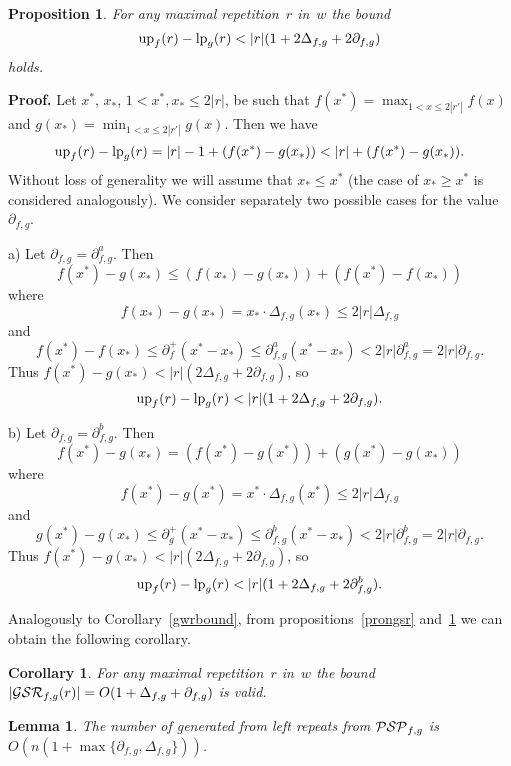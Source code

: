 \documentclass{article}
\newtheorem{proposition}{Proposition}
\newtheorem{corollary}{Corollary}
\newtheorem{lemma}{Lemma}
\begin{document}
\begin{proposition}
For any maximal repetition~$r$ in~$w$ the bound
$$
{\rm up}_f (r)-{\rm lp}_g (r)<|r|(1+2\Delta_{f, g}+2\partial_{f, g})
$$
holds.
\label{ulpound}
\end{proposition}

{\bf Proof.} Let $x^*$, $x_*$, $1<x^*,x_*\le 2|r|$, be such that  $f(x^*)=\max_{1< x\le 2|r'|}f(x)$
and $g(x_*)=\min_{1< x\le 2|r'|}g(x)$.
Then we have
$$
{\rm up}_f (r)-{\rm lp}_g (r)=|r|-1+(f(x^*)-g(x_*))<|r|+(f(x^*)-g(x_*)).
$$
Without loss of generality we will assume that $x_*\le x^*$ (the case of $x_*\ge x^*$ 
is considered analogously). We consider separately two possible cases for
the value $\partial_{f, g}$.

a) Let $\partial_{f, g}=\partial^a_{f, g}$. Then
$$
f(x^*)-g(x_*)\le (f(x_*)-g(x_*))+(f(x^*)-f(x_*))
$$
where
$$
f(x_*)-g(x_*)=x_*\cdot\Delta_{f, g}(x_*)\le 2|r|\Delta_{f, g}
$$
and
$$
f(x^*)-f(x_*)\le \partial^+_f(x^*-x_*)\le \partial^a_{f, g}(x^*-x_*)
<2|r|\partial^a_{f, g}=2|r|\partial_{f, g}.
$$
Thus $f(x^*)-g(x_*)<|r|(2\Delta_{f, g}+2\partial_{f, g})$, so
$$
{\rm up}_f (r)-{\rm lp}_g (r)<|r|(1+2\Delta_{f, g}+2\partial_{f, g}).
$$

b) Let $\partial_{f, g}=\partial^b_{f, g}$. Then
$$
f(x^*)-g(x_*)=(f(x^*)-g(x^*))+(g(x^*)-g(x_*))
$$
where
$$
f(x^*)-g(x^*)=x^*\cdot\Delta_{f, g}(x^*)\le 2|r|\Delta_{f, g}
$$
and
$$
g(x^*)-g(x_*)\le \partial^+_g(x^*-x_*)\le \partial^b_{f, g}(x^*-x_*)
<2|r|\partial^b_{f, g}=2|r|\partial_{f, g}.
$$
Thus $f(x^*)-g(x_*)<|r|(2\Delta_{f, g}+2\partial_{f, g})$, so
$$
{\rm up}_f (r)-{\rm lp}_g (r)<|r|(1+2\Delta_{f, g}+2\partial^b_{f, g}).
$$

Analogously to Corollary~\ref{gwrbound}, from propositions~\ref{prongsr} 
and~\ref{ulpound} we can obtain the following corollary.
\begin{corollary}
For any maximal repetition~$r$ in~$w$ the bound 
$|{\cal GSR}_{f,g} (r)|=O(1+\Delta_{f, g}+\partial_{f, g})$ is valid.
\label{gsrbound}
\end{corollary}

\begin{lemma}
The number of generated from left repeats from ${\cal PSP}_{f,g}$ is
$O(n(1+\max\{\partial_{f, g}, \Delta_{f, g}\}))$. 
\label{onleftPSP}
\end{lemma}
\end{document}

